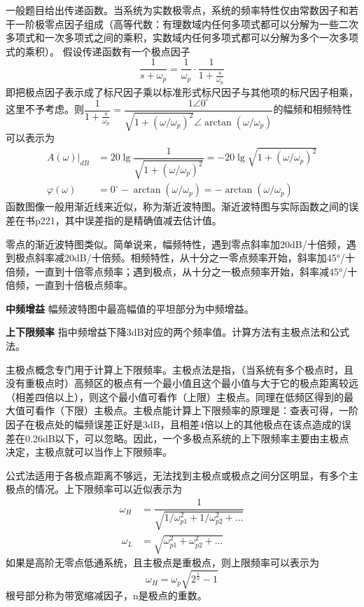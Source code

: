 \documentclass{ctexart}
\newcommand*{\noindbfquad}[1]{{\noindent \bf{#1} \qquad}}
\begin{document}
一般题目给出传递函数。当系统为实数极零点，系统的频率特性仅由常数因子和若干一阶极零点因子组成（高等代数：有理数域内任何多项式都可以分解为一些二次多项式和一次多项式之间的乘积，实数域内任何多项式都可以分解为多个一次多项式的乘积）。
假设传递函数有一个极点因子
\begin{equation}
    \dfrac{1}{s+\omega_p}=\dfrac{1}{\omega_p}\cdot \dfrac{1}{1+\frac{s}{\omega_p}}
\end{equation}
即把极点因子表示成了标尺因子乘以标准形式标尺因子与其他项的标尺因子相乘，这里不予考虑。则$\dfrac{1}{1+\frac{s}{\omega_p}}=\dfrac{1\angle 0^\circ}{\sqrt{1+(\omega / \omega_p)^2}\angle \arctan (\omega / \omega_p)}$的幅频和相频特性可以表示为
\begin{align}
    A(\omega)|_{dB}&=20\lg \dfrac{1}{\sqrt{1+(\omega / \omega_p)^2}}=-20\lg\sqrt{1+(\omega / \omega_p)^2}\\
    \varphi(\omega)&=0^\circ -\arctan (\omega / \omega_p)=-\arctan (\omega / \omega_p)
\end{align}
函数图像一般用渐近线来近似，称为渐近波特图。渐近波特图与实际函数之间的误差在书p221，其中误差指的是精确值减去估计值。

零点的渐近波特图类似。简单说来，幅频特性，遇到零点斜率加20dB/十倍频，遇到极点斜率减20dB/十倍频。相频特性，从十分之一零点频率开始，斜率加45°/十倍频，一直到十倍零点频率；遇到极点，从十分之一极点频率开始，斜率减45°/十倍频，一直到十倍极点频率。

\noindbfquad{中频增益} 幅频波特图中最高幅值的平坦部分为中频增益。

\noindbfquad{上下限频率} 指中频增益下降3dB对应的两个频率值。计算方法有主极点法和公式法。

主极点概念专门用于计算上下限频率。主极点法是指，（当系统有多个极点时，且没有重极点时）高频区的极点有一个最小值且这个最小值与大于它的极点距离较远（相差四倍以上），则这个最小值可看作（上限）主极点。同理在低频区得到的最大值可看作（下限）主极点。主极点能计算上下限频率的原理是：查表可得，一阶因子在极点处的幅频误差正好是3dB，且相差4倍以上的其他极点在该点造成的误差在0.26dB以下，可以忽略。因此，一个多极点系统的上下限频率主要由主极点决定，主极点就可以当作上下限频率。

公式法适用于各极点距离不够远，无法找到主极点或极点之间分区明显，有多个主极点的情况。上下限频率可以近似表示为
\begin{align}
    \omega_H&=\dfrac{1}{\sqrt{1/\omega_{p1}^2+1/\omega_{p2}^2+...}}\\\
    \omega_L&=\sqrt{\omega_{p1}^2+\omega_{p2}^2+...}
\end{align}
如果是高阶无零点低通系统，且主极点是重极点，则上限频率可以表示为
\begin{equation}
    \omega_H=\omega_p\sqrt{2^{\frac{1}{n}}-1}
\end{equation}
根号部分称为带宽缩减因子，n是极点的重数。
\end{document}
